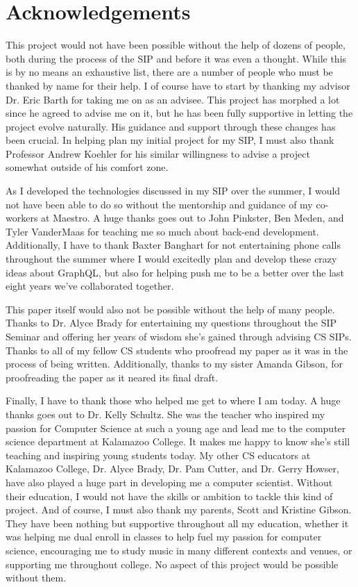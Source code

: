 \section*{Acknowledgements}
This project would not have been possible without the help of dozens of people, both during the process of the SIP and before it was even a thought.  While this is by no means an exhaustive list, there are a number of people who must be thanked by name for their help.  I of course have to start by thanking my advisor Dr. Eric Barth for taking me on as an advisee.  This project has morphed a lot since he agreed to advise me on it, but he has been fully supportive in letting the project evolve naturally.  His guidance and support through these changes has been crucial.  In helping plan my initial project for my SIP, I must also thank Professor Andrew Koehler for his similar willingness to advise a project somewhat outside of his comfort zone.

As I developed the technologies discussed in my SIP over the summer, I would not have been able to do so without the mentorship and guidance of my co-workers at Maestro.  A huge thanks goes out to John Pinkster, Ben Meden, and Tyler VanderMaas for teaching me so much about back-end development.  Additionally, I have to thank Baxter Banghart for not entertaining phone calls throughout the summer where I would excitedly plan and develop these crazy ideas about GraphQL, but also for helping push me to be a better over the last eight years we've collaborated together.

This paper itself would also not be possible without the help of many people.  Thanks to Dr. Alyce Brady for entertaining my questions throughout the SIP Seminar and offering her years of wisdom she's gained through advising CS SIPs.  Thanks to all of my fellow CS students who proofread my paper as it was in the process of being written.  Additionally, thanks to my sister Amanda Gibson, for proofreading the paper as it neared its final draft.

Finally, I have to thank those who helped me get to where I am today.  A huge thanks goes out to Dr. Kelly Schultz.  She was the teacher who inspired my passion for Computer Science at such a young age and lead me to the computer science department at Kalamazoo College.  It makes me happy to know she's still teaching and inspiring young students today.  My other CS educators at Kalamazoo College, Dr. Alyce Brady, Dr. Pam Cutter, and Dr. Gerry Howser, have also played a huge part in developing me a computer scientist.  Without their education, I would not have the skills or ambition to tackle this kind of project.   And of course, I must also thank my parents, Scott and Kristine Gibson.  They have been nothing but supportive throughout all my education, whether it was helping me dual enroll in classes to help fuel my passion for computer science, encouraging me to study music in many different contexts and venues, or supporting me throughout college. No aspect of this project would be possible without them.
\newpage